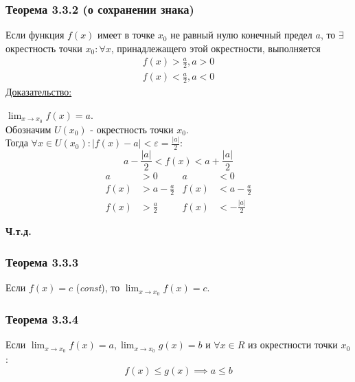 \documentclass[12pt]{article}
\begin{document}
    \subsubsection*{Теорема 3.3.2 (о сохранении знака)}\label{th:3.3.2}
    Если функция $f(x)$ имеет в точке $x_0$ не равный нулю конечный предел $a$, то $\exists$ окрестность точки $x_0 : \forall x$, принадлежащего этой окрестности, выполняется
    \begin{gather*}
        f(x) > \frac{a}{2}, a > 0\\
        f(x) < \frac{a}{2}, a < 0
    \end{gather*}
    \underline{Доказательство:}
    \begin{adjustwidth}{1.5em}{1.5em}
        $\lim_{x\to x_0}f(x) = a$.\\
        Обозначим $U(x_0)$ - окрестность точки $x_0$.\\
        Тогда $\forall x \in U(x_0) : |f(x) - a| < \varepsilon = \frac{|a|}{2}$:
        \[a - \frac{|a|}{2} < f(x) < a + \frac{|a|}{2}\]
        \begin{align*}
            a &> 0 & a &< 0\\
            f(x) &> a - \frac{a}{2} & f(x) &< a - \frac{a}{2}\\
            f(x) &> \frac{a}{2} & f(x) &< -\frac{|a|}{2}
        \end{align*}
        \begin{center}
            \textbf{Ч.т.д.}
        \end{center}
    \end{adjustwidth}

    \subsubsection*{Теорема 3.3.3}\label{th:3.3.3}
    Если $f(x) = c$ (\textit{const}), то $\lim_{x\to x_0}f(x) = c$.
    
    \subsubsection*{Теорема 3.3.4}\label{th:3.3.4}
    Если $\lim_{x\to x_0}f(x) = a, \lim_{x \to x_0}g(x) = b$ и $\forall x \in R$ из окрестности точки $x_0$:
    \[ f(x) \le g(x) \implies a \le b \]
    
\end{document}
